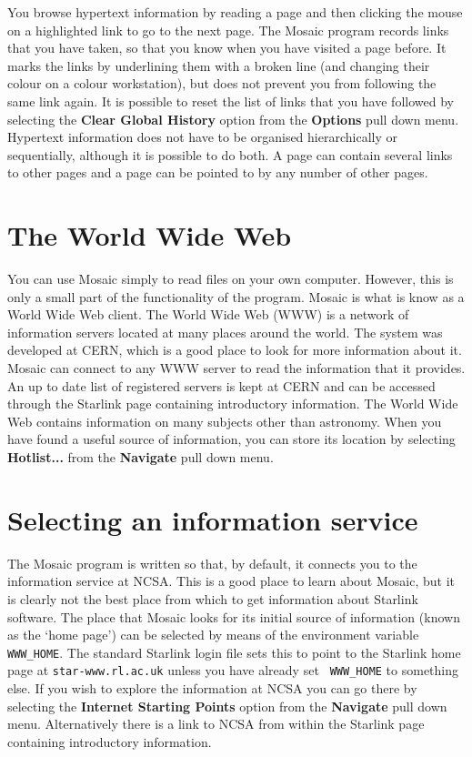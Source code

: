 You browse hypertext information by reading a page and then clicking the mouse
on a highlighted link to go to the next page. The Mosaic program records links
that you have taken, so that you know when you have visited a page before. It
marks the links by underlining them with a broken line (and changing their
colour on a colour workstation), but does not prevent you from following the
same link again. It is possible to reset the list of links that you have
followed by selecting the {\bf Clear Global History} option from the {\bf
Options} pull down menu. Hypertext information does not have to be organised
hierarchically or sequentially, although it is possible to do both. A page can
contain several links to other pages and a page can be pointed to by any number
of other pages. 


\section{The World Wide Web}

You can use Mosaic simply to read files on your own computer. However, this is
only a small part of the functionality of the program. Mosaic is what is know
as a World Wide Web client. The World Wide Web (WWW) is a network of
information servers located at many places around the world. The system was
developed at CERN, which is a good place to look for more information about it.
Mosaic can connect to any WWW server to read the information that it provides.
An up to date list of registered servers is kept at CERN and can be accessed
through the Starlink page containing introductory information. The World Wide
Web contains information on many subjects other than astronomy. When you have
found a useful source of information, you can store its location by selecting
{\bf Hotlist...} from the {\bf Navigate} pull down menu. 

\section{Selecting an information service}
\label{service}

The Mosaic program is written so that, by default, it connects you to the
information service at NCSA. This is a good place to learn about Mosaic, but it
is clearly not the best place from which to get information about Starlink
software. The place that Mosaic looks for its initial source of information
(known as the `home page') can be selected by means of the environment variable
{\tt WWW\_HOME}. The standard Starlink login file sets this to point to the
Starlink home page at {\tt star-www.rl.ac.uk} unless you have already set {\tt
WWW\_HOME} to something else. If you wish to explore the information at NCSA
you can go there by selecting the {\bf Internet Starting Points} option from
the {\bf Navigate} pull down menu. Alternatively there is a link to NCSA from
within the Starlink page containing introductory information. 

